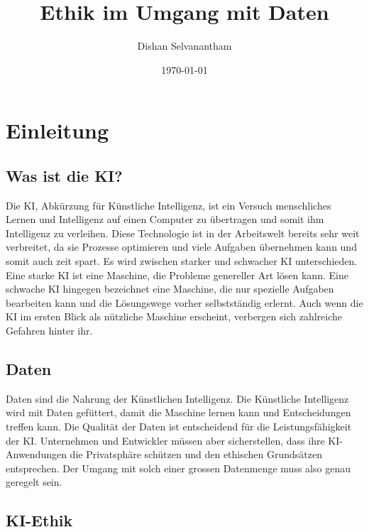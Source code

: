 \documentclass{report}
\title{Ethik im Umgang mit Daten}
\author{Dishan Selvanantham}
\date{\today}
\begin{document}
\maketitle


\tableofcontents

\chapter{Einleitung}

\section{Was ist die KI?}

Die KI, Abkürzung für Künstliche Intelligenz, ist ein Versuch menschliches Lernen und Intelligenz auf einen Computer zu übertragen und somit ihm Intelligenz zu verleihen. Diese Technologie ist in der Arbeitswelt bereits sehr weit verbreitet, da sie Prozesse optimieren und viele Aufgaben übernehmen kann und somit auch zeit spart. Es wird zwischen starker und schwacher KI unterschieden. Eine starke KI ist eine Maschine, die Probleme genereller Art lösen kann. Eine schwache KI hingegen bezeichnet eine Maschine, die nur spezielle Aufgaben bearbeiten kann und die Lösungswege vorher selbstständig erlernt. Auch wenn die KI im ersten Blick als nützliche Maschine erscheint, verbergen sich zahlreiche Gefahren hinter ihr.

\section{Daten}

Daten sind die Nahrung der Künstlichen Intelligenz. Die Künstliche Intelligenz wird mit Daten gefüttert, damit die Maschine lernen kann und Entscheidungen treffen kann. Die Qualität der Daten ist entscheidend für die Leistungsfähigkeit der KI. Unternehmen und Entwickler müssen aber sicherstellen, dass ihre KI- Anwendungen die Privatsphäre schützen und den ethischen Grundsätzen entsprechen. Der Umgang mit solch einer grossen Datenmenge muss also genau geregelt sein.

\section{KI-Ethik}
\end{document}
